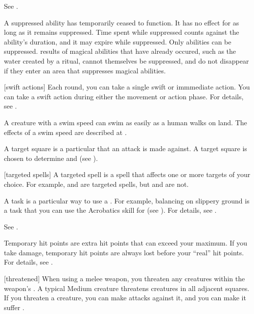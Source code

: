  See .

 A suppressed ability has temporarily ceased to function.
It has no effect for as long as it remains suppressed.
Time spent while suppressed counts against the ability's duration, and it may expire while suppressed.
Only  abilities can be suppressed.
 results of magical abilities that have already occured, such as the water created by a  ritual, cannot themselves be suppressed, and do not disappear if they enter an area that suppresses magical abilities.

[swift actions] Each round, you can take a single swift or immmediate action.
You can take a swift action during either the movement or action phase.
For details, see .

 A creature with a swim speed can swim as easily as a human walks on land.
The effects of a swim speed are described at .

 A target square is a particular  that an attack is made against.
A target square is chosen to determine  and  (see ).

[targeted spells] A targeted spell is a spell that affects one or more targets of your choice.
For example,  and  are targeted spells, but  and  are not.

 A task is a particular way to use a .
For example, balancing on slippery ground is a task that you can use the Acrobatics skill for (see ).
For details, see .

 See .

 Temporary hit points are extra hit points that can exceed your maximum.
If you take damage, temporary hit points are always lost before your ``real'' hit points.
For details, see .

[threatened] When using a melee weapon, you threaten any creatures within the weapon's .
A typical Medium creature threatens creatures in all adjacent squares.
If you threaten a creature, you can make  attacks against it, and you can make it suffer .

